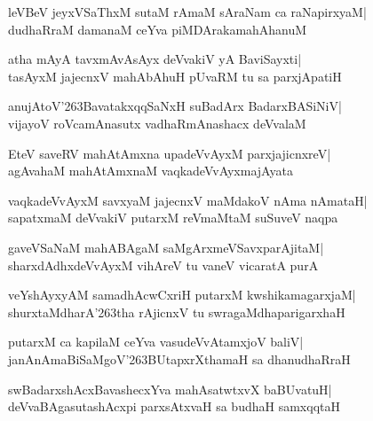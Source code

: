 \documentclass[twoside,12pt,openright]{book}
\def\S{\char'263}
\newcounter{shloka}[chapter]
\begin{document}
\begin{shloka}%
leVBeV jeyxVSaThxM sutaM rAmaM sAraNam ca raNapirxyaM|\\
dudhaRraM damanaM ceYva piMDArakamahAhanuM
\end{shloka}

\begin{shloka}%
atha mAyA tavxmAvAsAyx deVvakiV yA BaviSayxti|\\
tasAyxM jajecnxV mahAbAhuH pUvaRM tu sa parxjApatiH
\end{shloka}

\begin{shloka}%
anujAtoV\S BavatakxqqSaNxH suBadArx BadarxBASiNiV|\\
vijayoV roVcamAnasutx vadhaRmAnashacx deVvalaM
\end{shloka}

\begin{shloka}%
EteV saveRV mahAtAmxna upadeVvAyxM parxjajicnxreV|\\
agAvahaM mahAtAmxnaM vaqkadeVvAyxmajAyata
\end{shloka}

\begin{shloka}%
vaqkadeVvAyxM savxyaM jajecnxV maMdakoV nAma nAmataH|\\
sapatxmaM deVvakiV putarxM reVmaMtaM suSuveV naqpa
\end{shloka}

\begin{shloka}%
gaveVSaNaM mahABAgaM saMgArxmeVSavxparAjitaM|\\
sharxdAdhxdeVvAyxM vihAreV tu vaneV vicaratA purA
\end{shloka}

\begin{shloka}%
veYshAyxyAM samadhAcwCxriH putarxM kwshikamagarxjaM|\\
shurxtaMdharA\S tha rAjicnxV tu swragaMdhaparigarxhaH
\end{shloka}

\begin{shloka}%
putarxM ca kapilaM ceYva vasudeVvAtamxjoV baliV|\\
janAnAmaBiSaMgoV\S BUtapxrXthamaH sa dhanudhaRraH
\end{shloka}

\begin{shloka}%
swBadarxshAcxBavashecxYva mahAsatwtxvX baBUvatuH|\\
deVvaBAgasutashAcxpi parxsAtxvaH sa budhaH samxqqtaH
\end{shloka}
\end{document}
